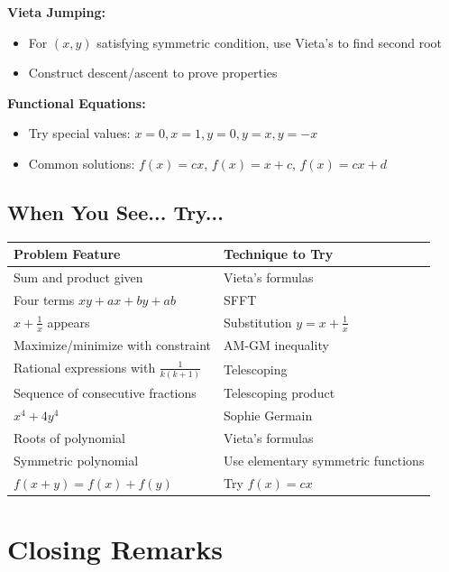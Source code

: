 \documentclass[12pt]{extarticle}
\begin{document}
\textbf{Vieta Jumping:}
\begin{itemize}
    \item For $(x,y)$ satisfying symmetric condition, use Vieta's to find second root
    \item Construct descent/ascent to prove properties
\end{itemize}

\textbf{Functional Equations:}
\begin{itemize}
    \item Try special values: $x=0, x=1, y=0, y=x, y=-x$
    \item Common solutions: $f(x) = cx$, $f(x) = x + c$, $f(x) = cx + d$
\end{itemize}

\subsection*{When You See... Try...}

\begin{center}
\begin{tabular}{ll}
\hline
\textbf{Problem Feature} & \textbf{Technique to Try} \\
\hline
Sum and product given & Vieta's formulas \\
Four terms $xy + ax + by + ab$ & SFFT \\
$x + \frac{1}{x}$ appears & Substitution $y = x + \frac{1}{x}$ \\
Maximize/minimize with constraint & AM-GM inequality \\
Rational expressions with $\frac{1}{k(k+1)}$ & Telescoping \\
Sequence of consecutive fractions & Telescoping product \\
$x^4 + 4y^4$ & Sophie Germain \\
Roots of polynomial & Vieta's formulas \\
Symmetric polynomial & Use elementary symmetric functions \\
$f(x+y) = f(x) + f(y)$ & Try $f(x) = cx$ \\
\hline
\end{tabular}
\end{center}

\newpage

\section*{Closing Remarks}
\end{document}
